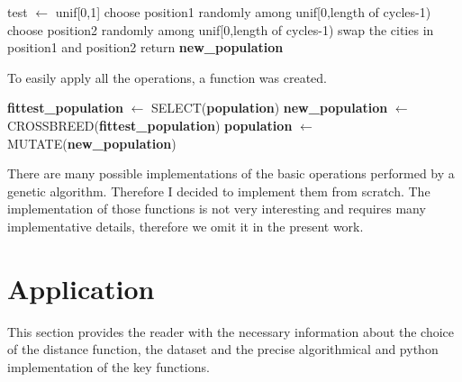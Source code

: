 \documentclass{article}
\begin{document}
\begin{algorithm}[H]
    \begin{algorithmic}[1]
        \State test $\leftarrow$ unif[0,1]
        	\State choose position1 randomly among unif[0,length of cycles-1)
  			\State choose position2 randomly among unif[0,length of cycles-1)
  			\State swap the cities in position1 and position2
        \EndIf
       \EndFor
        \State return \textbf{new\_population}
       \EndFunction
\end{algorithmic}
\end{algorithm}
\noindent To easily apply all the operations, a function was created.

\begin{algorithm}[H]
    \begin{algorithmic}[1]
        \State \textbf{fittest\_population} $\leftarrow$ SELECT(\textbf{population})
        \State \textbf{new\_population} $\leftarrow$ CROSSBREED(\textbf{fittest\_population})
       \State \textbf{population} $\leftarrow$ MUTATE(\textbf{new\_population})
       \EndFunction
\end{algorithmic}
\end{algorithm}

\noindent There are many possible implementations of the basic operations performed by a genetic algorithm. Therefore I decided to implement them from scratch. The implementation of those functions is not very interesting and requires many implementative details, therefore we omit it in the present work.

\section{Application} 
This section provides the reader with the necessary information about the choice of the distance function, the dataset and the precise algorithmical and python implementation of the key functions.
\end{document}
